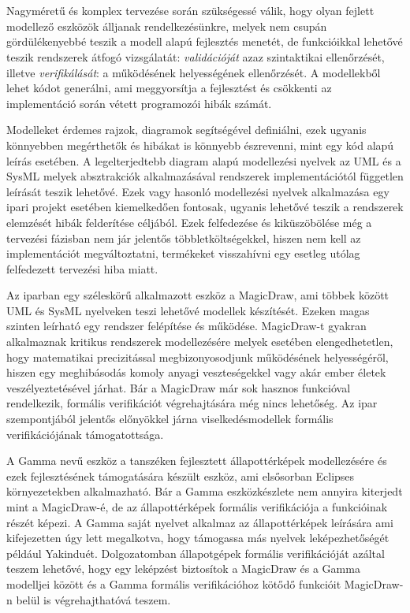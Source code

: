 \chapter{\bevezetes}


Nagyméretű és komplex tervezése során szükségessé válik, hogy olyan fejlett modellező eszközök álljanak rendelkezésünkre, melyek nem csupán gördülékenyebbé teszik a modell alapú fejlesztés menetét, de funkcióikkal lehetővé teszik rendszerek átfogó vizsgálatát: \emph{validációját} azaz szintaktikai ellenőrzését, illetve \emph{verifikálását}: a működésének helyességének ellenőrzését. A modellekből lehet kódot generálni, ami meggyorsítja a fejlesztést és csökkenti az implementáció során vétett programozói hibák számát.

Modelleket érdemes rajzok, diagramok segítségével definiálni, ezek ugyanis könnyebben megérthetők és hibákat is könnyebb észrevenni, mint egy kód alapú leírás esetében. A legelterjedtebb diagram alapú modellezési nyelvek az UML és a SysML melyek absztrakciók alkalmazásával rendszerek implementációtól független leírását teszik lehetővé. Ezek vagy hasonló modellezési nyelvek alkalmazása egy ipari projekt esetében kiemelkedően fontosak, ugyanis lehetővé teszik a rendszerek elemzését hibák felderítése céljából. Ezek felfedezése és kiküszöbölése még a tervezési fázisban nem jár jelentős többletköltségekkel, hiszen nem kell az implementációt megváltoztatni, termékeket visszahívni egy esetleg utólag felfedezett tervezési hiba miatt.

Az iparban egy széleskörű alkalmazott eszköz a MagicDraw, ami többek között UML és SysML nyelveken teszi lehetővé modellek készítését. Ezeken magas szinten leírható egy rendszer felépítése és működése. MagicDraw-t gyakran alkalmaznak kritikus rendszerek modellezésére melyek esetében elengedhetetlen, hogy matematikai precizitással megbizonyosodjunk működésének helyességéről, hiszen egy meghibásodás komoly anyagi veszteségekkel vagy akár ember életek veszélyeztetésével járhat. Bár a MagicDraw már sok hasznos funkcióval rendelkezik, formális verifikációt végrehajtására még nincs lehetőség. Az ipar szempontjából jelentős előnyökkel járna viselkedésmodellek formális verifikációjának támogatottsága.

A Gamma nevű eszköz a tanszéken fejlesztett állapottérképek modellezésére és ezek fejlesztésének támogatására készült eszköz, ami elsősorban Eclipses környezetekben alkalmazható. Bár a Gamma eszközkészlete nem annyira kiterjedt mint a MagicDraw-é, de az állapottérképek formális verifikációja a funkcióinak részét képezi. A Gamma saját nyelvet alkalmaz az állapottérképek leírására ami kifejezetten úgy lett megalkotva, hogy támogassa más nyelvek leképezhetőségét például Yakinduét. Dolgozatomban állapotgépek formális verifikációját azáltal teszem lehetővé, hogy egy leképzést biztosítok a MagicDraw és a Gamma modelljei között és a Gamma formális verifikációhoz kötődő funkcióit MagicDraw-n belül is végrehajthatóvá teszem.

